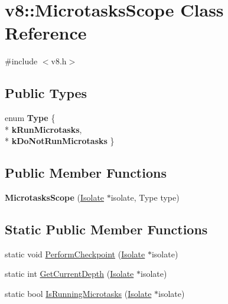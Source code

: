 \hypertarget{classv8_1_1_microtasks_scope}{}\section{v8\+:\+:Microtasks\+Scope Class Reference}
\label{classv8_1_1_microtasks_scope}


{\ttfamily \#include $<$v8.\+h$>$}

\subsection*{Public Types}
\begin{DoxyCompactItemize}
\item 
enum {\bfseries Type} \{ \\*
{\bfseries k\+Run\+Microtasks}, 
\\*
{\bfseries k\+Do\+Not\+Run\+Microtasks}
 \}\hypertarget{classv8_1_1_microtasks_scope_a826cf210978221741a0467cd9be6996f}{}\label{classv8_1_1_microtasks_scope_a826cf210978221741a0467cd9be6996f}

\end{DoxyCompactItemize}
\subsection*{Public Member Functions}
\begin{DoxyCompactItemize}
\item 
{\bfseries Microtasks\+Scope} (\hyperlink{classv8_1_1_isolate}{Isolate} $\ast$isolate, Type type)\hypertarget{classv8_1_1_microtasks_scope_a40348ac94c7e9ea405c2546d94d9d927}{}\label{classv8_1_1_microtasks_scope_a40348ac94c7e9ea405c2546d94d9d927}

\end{DoxyCompactItemize}
\subsection*{Static Public Member Functions}
\begin{DoxyCompactItemize}
\item 
static void \hyperlink{classv8_1_1_microtasks_scope_a1995095b585828067d367d5362bef65e}{Perform\+Checkpoint} (\hyperlink{classv8_1_1_isolate}{Isolate} $\ast$isolate)
\item 
static int \hyperlink{classv8_1_1_microtasks_scope_ad49e24bc69b61d7a67045cf658da1fce}{Get\+Current\+Depth} (\hyperlink{classv8_1_1_isolate}{Isolate} $\ast$isolate)
\item 
static bool \hyperlink{classv8_1_1_microtasks_scope_add7bcfed084afcd0d2729c3ac382145c}{Is\+Running\+Microtasks} (\hyperlink{classv8_1_1_isolate}{Isolate} $\ast$isolate)
\end{DoxyCompactItemize}
